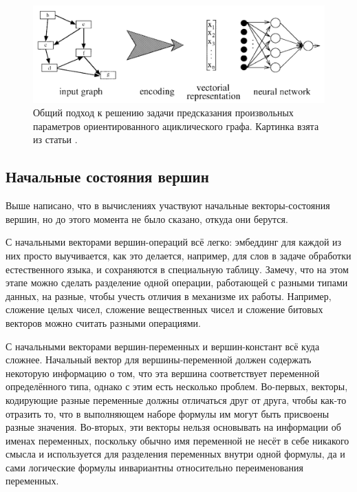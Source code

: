 \begin{figure}[ht]
\begin{center}
    \includegraphics[scale=0.25]{./assets/rvnn-process.png}
    \caption{\label{rvnn-process} Общий подход к решению задачи предсказания произвольных параметров ориентированного ациклического графа. Картинка взята из статьи \cite{rvnn-intro-paper}.}
\end{center}
\end{figure}

\subsection{Начальные состояния вершин}

Выше написано, что в вычислениях участвуют начальные векторы-состояния вершин, но до этого момента не было сказано, откуда они берутся.

С начальными векторами вершин-операций всё легко: эмбеддинг для каждой из них просто выучивается, как это делается, например, для слов в задаче обработки естественного языка, и сохраняются в специальную таблицу. Замечу, что на этом этапе можно сделать разделение одной операции, работающей с разными типами данных, на разные, чтобы учесть отличия в механизме их работы. Например, сложение целых чисел, сложение вещественных чисел и сложение битовых векторов можно считать разными операциями.

С начальными векторами вершин-переменных и вершин-констант всё куда сложнее. Начальный вектор для вершины-переменной должен содержать некоторую информацию о том, что эта вершина соответствует переменной определённого типа, однако с этим есть несколько проблем. Во-первых, векторы, кодирующие разные переменные должны отличаться друг от друга, чтобы как-то отразить то, что в выполняющем наборе формулы им могут быть присвоены разные значения. Во-вторых, эти векторы нельзя основывать на информации об именах переменных, поскольку обычно имя переменной не несёт в себе никакого смысла и используется для разделения переменных внутри одной формулы, да и сами логические формулы инвариантны относительно переименования переменных.

